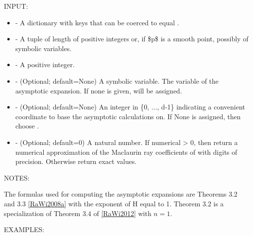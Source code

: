 \documentclass[letterpaper,12pt,openany,oneside]{sphinxmanual}
\begin{document}
\begin{fulllineitems}
\begin{fulllineitems}
INPUT:
\begin{itemize}
\item {} 
 - A dictionary with keys that can be coerced to equal
.

\item {} 
 - A tuple of length  of
positive integers or, if \$p\$ is a smooth point,
possibly of symbolic variables.

\item {} 
 - A positive integer.

\item {} 
 - (Optional; default=None) A symbolic variable.
The variable of the asymptotic expansion.
If none is given,  will be assigned.

\item {} 
- (Optional; default=None) An integer in
\{0, ..., d-1\} indicating a convenient coordinate to base
the asymptotic calculations on.
If None is assigned, then choose .

\item {} 
 - (Optional; default=0) A natural number.
If numerical \textgreater{} 0, then return a numerical approximation of the
Maclaurin ray coefficients of  with  digits
of precision.
Otherwise return exact values.

\end{itemize}

NOTES:

The formulas used for computing the asymptotic expansions are
Theorems 3.2 and 3.3 {\hyperref[amgf:rawi2008a]{{[}RaWi2008a{]}}} with the exponent of H equal to 1.
Theorem 3.2 is a specialization of Theorem 3.4 of {\hyperref[amgf:rawi2012]{{[}RaWi2012{]}}}
with $n=1$.

EXAMPLES:


\end{fulllineitems}
\end{fulllineitems}
\end{document}
